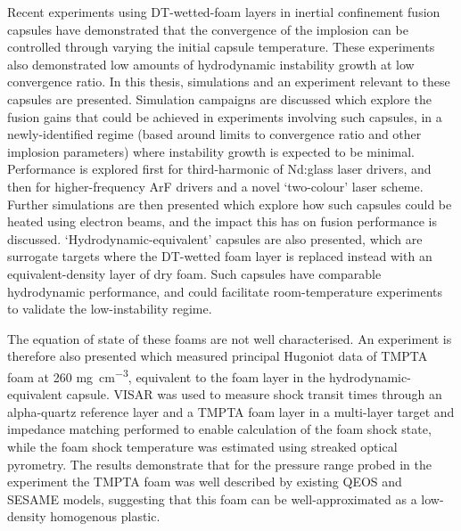 Recent experiments using DT-wetted-foam layers in inertial confinement fusion capsules have demonstrated that the convergence of the implosion can be controlled through varying the initial capsule temperature. These experiments also demonstrated low amounts of hydrodynamic instability growth at low convergence ratio. In this thesis, simulations and an experiment relevant to these capsules are presented. Simulation campaigns are discussed which explore the fusion gains that could be achieved in experiments involving such capsules, in a newly-identified regime (based around limits to convergence ratio and other implosion parameters) where instability growth is expected to be minimal. Performance is explored first for third-harmonic of Nd:glass laser drivers, and then for higher-frequency ArF drivers and a novel `two-colour' laser scheme. Further simulations are then presented which explore how such capsules could be heated using electron beams, and the impact this has on fusion performance is discussed. `Hydrodynamic-equivalent' capsules are also presented, which are surrogate targets where the DT-wetted foam layer is replaced instead with an equivalent-density layer of dry foam. Such capsules have comparable hydrodynamic performance, and could facilitate room-temperature experiments to validate the low-instability regime.

The equation of state of these foams are not well characterised. An experiment is therefore also presented which measured principal Hugoniot data of TMPTA foam at 260 \unit{\milli\gram\per\centi\meter\cubed}, equivalent to the foam layer in the hydrodynamic-equivalent capsule. VISAR was used to measure shock transit times through an alpha-quartz reference layer and a TMPTA foam layer in a multi-layer target and impedance matching performed to enable calculation of the foam shock state, while the foam shock temperature was estimated using streaked optical pyrometry. The results demonstrate that for the pressure range probed in the experiment the TMPTA foam was well described by existing QEOS and SESAME models, suggesting that this foam can be well-approximated as a low-density homogenous plastic.